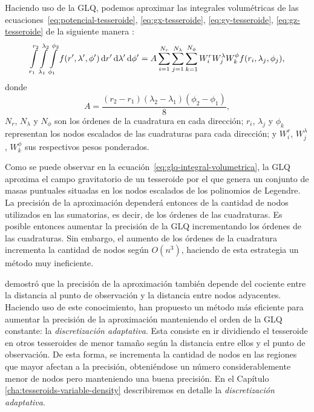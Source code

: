 Haciendo uso de la \ac{GLQ}, podemos aproximar las integrales volumétricas de
las ecuaciones~\ref{eq:potencial-tesseroide}, \ref{eq:gx-tesseroide},
\ref{eq:gy-tesseroide}, \ref{eq:gz-tesseroide} de la siguiente manera
\citep{asgharzadeh2007,uieda2016}:
%
\begin{equation}
    \int\limits_{r_1}^{r_2}
    \int\limits_{\lambda_1}^{\lambda_2}
    \int\limits_{\phi_1}^{\phi_2}
    f(r', \lambda', \phi')
    \mathop{}\!\textnormal{d} r' \mathop{}\!\textnormal{d} \lambda' \mathop{}\!\textnormal{d} \phi' =
    A
    \sum\limits_{i=1}^{N_r}
    \sum\limits_{j=1}^{N_\lambda}
    \sum\limits_{k=1}^{N_\phi}
    W_i^r
    W_j^\lambda
    W_k^\phi
    f(r_i, \lambda_j, \phi_j),
    \label{eq:glq-integral-volumetrica}
\end{equation}
%
donde
%
\begin{equation}
    A = \frac{
        (r_2 - r_1) (\lambda_2 - \lambda_1) (\phi_2 - \phi_1)
    }{8},
    \label{eq:glq-resize-factor}
\end{equation}
%
$N_r$, $N_\lambda$ y $N_\phi$ son los órdenes de la cuadratura en
cada dirección; $r_i$, $\lambda_j$ y $\phi_k$ representan los nodos escalados
de las cuadraturas para cada dirección; y $W_i^r$, $W_j^\lambda$, $W_k^\phi$
sus respectivos pesos ponderados.

Como se puede observar en la ecuación~\ref{eq:glq-integral-volumetrica}, la
\ac{GLQ} aproxima el campo gravitatorio de un tesseroide por el que genera
un conjunto de masas puntuales situadas en los nodos escalados de los
polinomios de Legendre.
La precisión de la aproximación dependerá entonces de la cantidad de nodos
utilizados en las sumatorias, es decir, de los órdenes de las cuadraturas.
Es posible entonces aumentar la precisión de la \ac{GLQ} incrementando los
órdenes de las cuadraturas.
Sin embargo, el aumento de los órdenes de la cuadratura incrementa la cantidad
de nodos según $O(n^3)$, haciendo de esta estrategia un método muy ineficiente.

\citet{ku1977} demostró que la precisión de la aproximación también depende del
cociente entre la distancia al punto de observación y la distancia entre nodos
adyacentes.
Haciendo uso de este conocimiento, \citet{li2011} han propuesto un método más
eficiente para aumentar la precisión de la aproximación manteniendo el orden de
la \ac{GLQ} constante: la \emph{discretización adaptativa}.
Esta consiste en ir dividiendo el tesseroide en otros tesseroides de menor
tamaño según la distancia entre ellos y el punto de observación.
De esta forma, se incrementa la cantidad de nodos en las regiones que mayor
afectan a la precisión, obteniéndose un número considerablemente menor de nodos
pero manteniendo una buena precisión.
En el Capítulo \ref{cha:tesseroids-variable-density} describiremos en detalle
la \emph{discretización adaptativa}.


